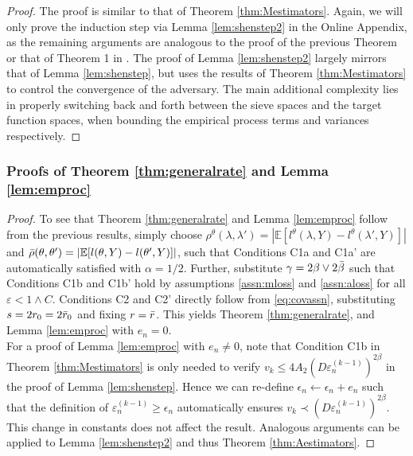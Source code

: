 \documentclass[12pt]{article}
\theoremstyle{myplain}
\theoremstyle{definition}
\theoremstyle{definition}
\theoremstyle{remark}
\numberwithin{equation}{section}
\begin{document}
\begin{proof}
The proof is similar to that of Theorem \ref{thm:Mestimators}. Again, we will only prove the induction step via Lemma \ref{lem:shenstep2} in the Online Appendix, as the remaining arguments are analogous to the proof of the previous Theorem or that of Theorem 1 in \cite{shen1994}. The proof of Lemma \ref{lem:shenstep2} largely mirrors that of Lemma \ref{lem:shenstep}, but uses the results of Theorem \ref{thm:Mestimators} to control the convergence of the adversary. The main additional complexity lies in properly switching back and forth between the sieve spaces and the target function spaces, when bounding the empirical process terms and variances respectively.
\end{proof}


\subsubsection{Proofs of Theorem \ref{thm:generalrate} and Lemma \ref{lem:emproc}} \label{subsubsec:ratesummary}
\begin{proof}
To see that Theorem \ref{thm:generalrate} and Lemma \ref{lem:emproc} follow from the previous results, simply choose $\rho^\theta(\lambda, \lambda')=|\mathbb{E}[l^\theta(\lambda, Y)-l^\theta(\lambda', Y)]|$ and $\Bar\rho(\theta, \theta')=|\mathbb{E}[l(\theta, Y)-l(\theta', Y)]|$, such that Conditions C1a and C1a' are automatically satisfied with $\alpha=1/2$. Further, substitute $\gamma=2\beta \vee 2\Bar\beta$ such that Conditions C1b and C1b' hold by assumptions \ref{assn:mloss} and \ref{assn:aloss} for all $\varepsilon<1\wedge C$. Conditions C2 and C2' directly follow from \ref{eq:covassn}, substituting $s=2r_0=2\Bar r_0$ and fixing $r=\Bar r$. This yields Theorem \ref{thm:generalrate}, and Lemma \ref{lem:emproc} with $e_n=0$.\\

For a proof of Lemma \ref{lem:emproc} with $e_n\neq 0$, note that Condition C1b in Theorem \ref{thm:Mestimators} is only needed to verify $v_k\leq 4A_2\left(D \varepsilon_n^{(k-1)}\right)^{2\beta}$ in the proof of Lemma \ref{lem:shenstep}. Hence we can re-define $\epsilon_n \gets \epsilon_n + e_n$ such that the definition of $\varepsilon_n^{(k-1)}\geq \epsilon_n$ automatically ensures $v_k\prec \left(D \varepsilon_n^{(k-1)}\right)^{2\beta}$. This change in constants does not affect the result. Analogous arguments can be applied to Lemma \ref{lem:shenstep2} and thus Theorem \ref{thm:Aestimators}.
\end{proof}
\end{document}
